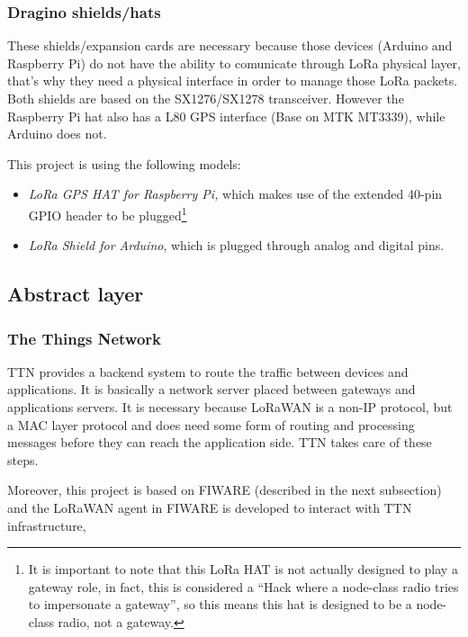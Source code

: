 \documentclass[11pt,a4paper,dvipsnames,twoside]{article}
\begin{document}
\subsubsection{Dragino shields/hats}\label{sssec:DraginoShields}
These shields/expansion cards are necessary because those devices (Arduino and Raspberry Pi) do not have the ability to comunicate through LoRa physical layer, that's why they need a physical interface in order to manage those LoRa packets. Both shields are based on the SX1276/SX1278 transceiver. However the Raspberry Pi hat also has a L80 GPS interface (Base on MTK MT3339), while Arduino does not.

This project is using the following models: 

\begin{itemize}
  \item \textit{LoRa GPS HAT for Raspberry Pi,}\cite{DraginoRpiHat} which makes use of the extended 40-pin GPIO header to be plugged\footnote{It is important to note that this LoRa HAT is not actually designed to play a gateway role, in fact, this is considered a \enquote{Hack where a node-class radio tries to impersonate a gateway}\cite{RpiHatHack}, so this means this hat is designed to be a node-class radio, not a gateway.}
  \item \textit{LoRa Shield for Arduino}\cite{DraginoArdShield}, which is plugged through analog and digital pins.
\end{itemize}

\subsection{Abstract layer}

\subsubsection{The Things Network}
TTN provides a backend system to route the traffic between devices and applications. It is basically a network server placed between gateways and applications servers. It is necessary because LoRaWAN is a non-IP protocol, but a MAC layer protocol and does need some form of routing and processing messages before they can reach the application side. TTN takes care of these steps.

Moreover, this project is based on FIWARE (described in the next subsection) and the LoRaWAN agent in FIWARE is developed to interact with TTN infrastructure, 
\end{document}
